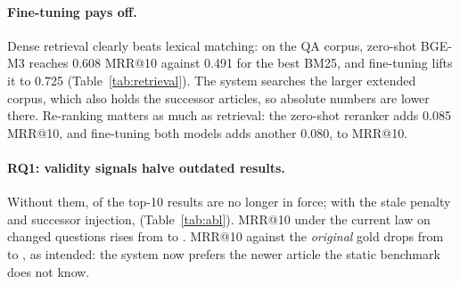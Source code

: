 \documentclass{article} %
\begin{document}
\begin{table}[t]
\centering
\caption{\textbf{Retrieval} (11,885 test questions). \emph{Left:} retrieval only on the QA corpus (68,663 passages).
\emph{Right:} the extended corpus used by the system (185,216 chunks, also holding the successor articles).}
\label{tab:retrieval}
\small
\begin{minipage}[t]{0.485\linewidth}\centering
{}
\end{minipage}\hfill
\begin{minipage}[t]{0.485\linewidth}\centering
{}
\end{minipage}
\end{table}

\paragraph{Fine-tuning pays off.}
Dense retrieval clearly beats lexical matching: on the QA corpus, zero-shot BGE-M3 reaches 0.608 MRR@10 against 0.491
for the best BM25, and fine-tuning lifts it to 0.725 (Table~\ref{tab:retrieval}). The system searches the larger
extended corpus, which also holds the successor articles, so absolute numbers are lower there. Re-ranking matters as
much as retrieval: the zero-shot reranker adds 0.085 MRR@10, and fine-tuning both models adds another 0.080, to
\textbf{\ResFtCeMrr} MRR@10.



\paragraph{RQ1: validity signals halve outdated results.}
Without them, \ResStaleNoTimePct{} of the top-10 results are no longer in force; with the stale penalty and successor
injection, \ResStaleTimePct{} (Table~\ref{tab:abl}). MRR@10 under the current law on changed questions rises from
\ResTmrrNoTime{} to \ResTmrrTime. MRR@10 against the \emph{original} gold drops from \ResFtCeMrr{} to \ResTimeMrr{}, as
intended: the system now prefers the newer article the static benchmark does not know.
\end{document}
